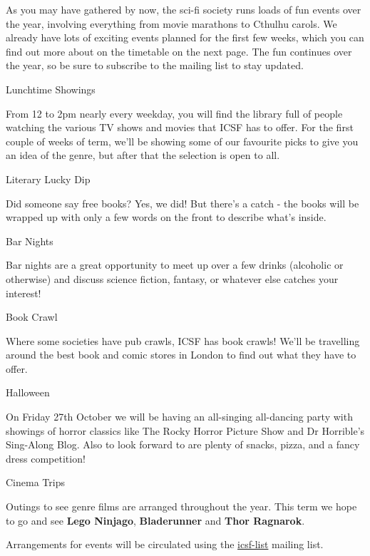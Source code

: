 \vspace{1mm} 

As you may have gathered by now, the sci-fi society runs loads of fun events over the year, involving everything from movie marathons to Cthulhu carols. We already have lots of exciting events planned for the first few weeks, which you can find out more about on the timetable on the next page. The fun continues over the year, so be sure to subscribe to the mailing list to stay updated. 

\vspace{2mm} {\Large Lunchtime Showings}

From 12 to 2pm nearly every weekday, you will find the library full of people watching the various TV shows and movies that ICSF has to offer. For the first couple of weeks of term, we'll be showing some of our favourite picks to give you an idea of the genre, but after that the selection is open to all.

\vspace{2mm} {\Large Literary Lucky Dip}

Did someone say free books? Yes, we did! But there's a catch - the books will be wrapped up with only a few words on the front to describe what's inside.

\vspace{2mm} {\Large Bar Nights}

Bar nights are a great opportunity to meet up over a few drinks (alcoholic or otherwise) and discuss science fiction, fantasy, or whatever else catches your interest!

\vspace{2mm} {\Large Book Crawl}

Where some societies have pub crawls, ICSF has book crawls! We'll be travelling around the best book and comic stores in London to find out what they have to offer.

\vspace{2mm} {\Large Halloween}

On Friday 27th October we will be having an all-singing all-dancing party with showings of horror classics like The Rocky Horror Picture Show and Dr Horrible's Sing-Along Blog. Also to look forward to are plenty of snacks, pizza, and a fancy dress competition!

\vspace{2mm} {\Large Cinema Trips}

Outings to see genre films are arranged throughout the year. This term we hope to go and see \textbf{Lego Ninjago}, \textbf{Bladerunner} and \textbf{Thor Ragnarok}.

Arrangements for events will be circulated using the \url{icsf-list} mailing list.

